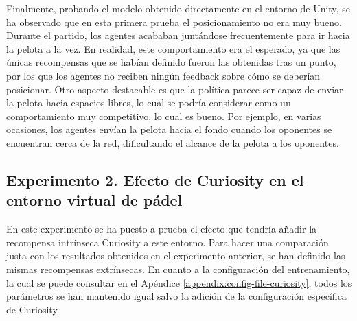 Finalmente, probando el modelo obtenido directamente en el entorno de Unity, se ha observado que en esta primera prueba el posicionamiento no era muy bueno. Durante el partido, los agentes acababan juntándose frecuentemente para ir hacia la pelota a la vez. En realidad, este comportamiento era el esperado, ya que las únicas recompensas que se habían definido fueron las obtenidas tras un punto, por los que los agentes no reciben ningún feedback sobre cómo se deberían posicionar. Otro aspecto destacable es que la política parece ser capaz de enviar la pelota hacia espacios libres, lo cual se podría considerar como un comportamiento muy competitivo, lo cual es bueno. Por ejemplo, en varias ocasiones, los agentes envían la pelota hacia el fondo cuando los oponentes se encuentran cerca de la red, dificultando el alcance de la pelota a los oponentes.

\subsection{Experimento 2. Efecto de Curiosity en el entorno virtual de pádel}

En este experimento se ha puesto a prueba el efecto que tendría añadir la recompensa intrínseca Curiosity a este entorno. Para hacer una comparación justa con los resultados obtenidos en el experimento anterior, se han definido las mismas recompensas extrínsecas. En cuanto a la configuración del entrenamiento, la cual se puede consultar en el Apéndice \ref{appendix:config-file-curiosity}, todos los parámetros se han mantenido igual salvo la adición de la configuración específica de Curiosity.

